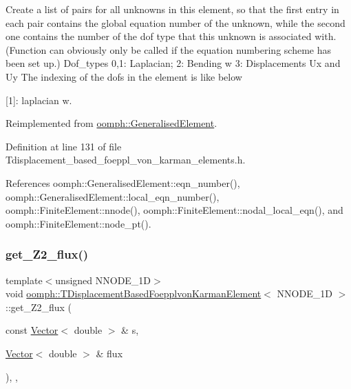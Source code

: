 Create a list of pairs for all unknowns in this element, so that the first entry in each pair contains the global equation number of the unknown, while the second one contains the number of the dof type that this unknown is associated with. (Function can obviously only be called if the equation numbering scheme has been set up.) Dof\+\_\+types 0,1\+: Laplacian; 2\+: Bending w 3\+: Displacements Ux and Uy The indexing of the dofs in the element is like below

\mbox{[}1\mbox{]}\+: laplacian w. 



Reimplemented from \hyperlink{classoomph_1_1GeneralisedElement_a069f59bfc3e607a5bebba52c6314d777}{oomph\+::\+Generalised\+Element}.



Definition at line 131 of file Tdisplacement\+\_\+based\+\_\+foeppl\+\_\+von\+\_\+karman\+\_\+elements.\+h.



References oomph\+::\+Generalised\+Element\+::eqn\+\_\+number(), oomph\+::\+Generalised\+Element\+::local\+\_\+eqn\+\_\+number(), oomph\+::\+Finite\+Element\+::nnode(), oomph\+::\+Finite\+Element\+::nodal\+\_\+local\+\_\+eqn(), and oomph\+::\+Finite\+Element\+::node\+\_\+pt().

\mbox{\label{classoomph_1_1TDisplacementBasedFoepplvonKarmanElement_a921610ebc718302d9e9fbb84e6f142f3}} 
\subsubsection{\texorpdfstring{get\+\_\+\+Z2\+\_\+flux()}{get\_Z2\_flux()}}
{\footnotesize\ttfamily template$<$unsigned N\+N\+O\+D\+E\+\_\+1D$>$ \\
void \hyperlink{classoomph_1_1TDisplacementBasedFoepplvonKarmanElement}{oomph\+::\+T\+Displacement\+Based\+Foepplvon\+Karman\+Element}$<$ N\+N\+O\+D\+E\+\_\+1D $>$\+::get\+\_\+\+Z2\+\_\+flux (\begin{DoxyParamCaption}\item[{const \hyperlink{classoomph_1_1Vector}{Vector}$<$ double $>$ \&}]{s,  }\item[{\hyperlink{classoomph_1_1Vector}{Vector}$<$ double $>$ \&}]{flux }\end{DoxyParamCaption})\hspace{0.3cm}{\ttfamily [inline]}, {\ttfamily [protected]}, {\ttfamily [virtual]}}




